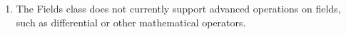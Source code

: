 

\begin{enumerate}

\item The Fields class does not currently support advanced
operations on fields, such as differential or other
mathematical operators.

\end{enumerate}



